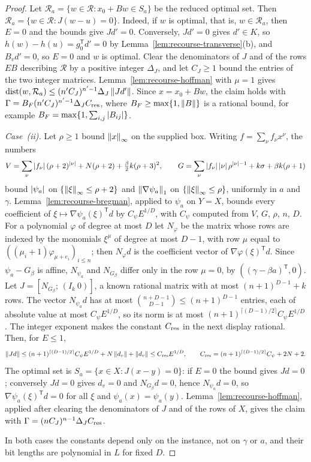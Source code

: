 \begin{proof}
Let $\mathcal R_a=\{w\in\mathcal R:x_0+Bw\in S_a\}$ be the reduced
optimal set. Then $\mathcal R_a=\{w\in\mathcal R:J(w-u)=0\}$. Indeed, if
$w$ is optimal, that is, $w\in\mathcal R_a$, then $E=0$ and the bounds
give $Jd'=0$. Conversely, $Jd'=0$ gives $d'\in K$, so
$h(w)-h(u)=g_0^{\mathsf T}d'=0$ by
Lemma~\ref{lem:recourse-transverse}(b), and $B_vd'=0$, so $E=0$ and $w$
is optimal. Clear
the denominators of $J$ and of the rows $EB$ describing $\mathcal R$ by
a positive integer $\Delta_J$, and let $C_J\ge1$ bound the entries of the
two integer matrices. Lemma~\ref{lem:recourse-hoffman} with $\mu=1$ gives
$\operatorname{dist}(w,\mathcal R_a)\le(n'C_J)^{n'-1}\Delta_J\left\lVert Jd'\right\rVert$. Since
$x=x_0+Bw$, the claim holds with
$\Gamma=B_F(n'C_J)^{n'-1}\Delta_JC_{\rm res}$, where $B_F\ge\max\{1,\left\lVert B\right\rVert\}$
is a rational bound, for example $B_F=\max\{1,\sum_{i,j}\left\lvert B_{ij}\right\rvert\}$.

\emph{Case~(ii).} Let $\rho\ge1$ bound $\left\lVert x\right\rVert_\infty$ on the supplied
box. Writing $f=\sum_\nu f_\nu x^\nu$, the numbers
\[
 V=\sum_\nu\left\lvert f_\nu\right\rvert(\rho+2)^{\left\lvert\nu\right\rvert}+N(\rho+2)+\tfrac\beta2k(\rho+3)^2,
 \qquad
 G=\sum_\nu\left\lvert f_\nu\right\rvert\left\lvert\nu\right\rvert\rho^{\left\lvert\nu\right\rvert-1}+k\sigma+\beta k(\rho+1)
\]
bound $\left\lvert\psi_a\right\rvert$ on $\{\left\lVert\xi\right\rVert_\infty\le\rho+2\}$ and
$\left\lVert\nabla\psi_a\right\rVert_1$ on $\{\left\lVert\xi\right\rVert_\infty\le\rho\}$, uniformly in $a$
and $\gamma$. Lemma~\ref{lem:recourse-bregman}, applied to $\psi_a$ on
$Y=X$, bounds every coefficient of $\xi\mapsto\nabla\psi_a(\xi)^{\mathsf T}d$
by $C_\psi E^{1/D}$, with $C_\psi$ computed from $V$, $G$, $\rho$, $n$, $D$.
For a polynomial $\varphi$ of degree at most $D$ let $N_\varphi$ be the
matrix whose rows are indexed by the monomials $\xi^\mu$ of degree at
most $D-1$, with row $\mu$ equal to $((\mu_i+1)\varphi_{\mu+e_i})_{i\le n}$;
then $N_\varphi d$ is the coefficient vector of
$\nabla\varphi(\xi)^{\mathsf T}d$. Since $\psi_a-G_\beta$ is affine,
$N_{\psi_a}$ and $N_{G_\beta}$ differ only in the row $\mu=0$, by
$((\gamma-\beta a)^{\mathsf T},0)$. Let $J=[N_{G_\beta};\,(I_k\ 0)]$,
a known rational matrix with at most $(n+1)^{D-1}+k$ rows. The vector
$N_{\psi_a}d$ has at most $\binom{n+D-1}{D-1}\le(n+1)^{D-1}$ entries, each
of absolute value at most $C_\psi E^{1/D}$, so its norm is at most
$(n+1)^{\lceil(D-1)/2\rceil}C_\psi E^{1/D}$. The integer exponent makes
the constant $C_{\rm res}$ in the next display rational. Then, for
$E\le1$,
\[
 \left\lVert Jd\right\rVert\le(n+1)^{\lceil(D-1)/2\rceil}C_\psi E^{1/D}+N\left\lVert d_v\right\rVert+\left\lVert d_v\right\rVert
 \le C_{\rm res}E^{1/D},\qquad
 C_{\rm res}=(n+1)^{\lceil(D-1)/2\rceil}C_\psi+2N+2 .
\]
The optimal set is $S_a=\{x\in X:J(x-y)=0\}$: if $E=0$ the bound gives
$Jd=0$; conversely $Jd=0$ gives $d_v=0$ and $N_{G_\beta}d=0$, hence
$N_{\psi_a}d=0$, so $\nabla\psi_a(\xi)^{\mathsf T}d=0$ for all $\xi$ and
$\psi_a(x)=\psi_a(y)$. Lemma~\ref{lem:recourse-hoffman}, applied after
clearing the denominators of $J$ and of the rows of $X$, gives the claim
with $\Gamma=(nC_J)^{n-1}\Delta_JC_{\rm res}$.

In both cases the constants depend only on the instance, not on
$\gamma$ or $a$, and their bit lengths are polynomial in $L$ for fixed
$D$.
\end{proof}

